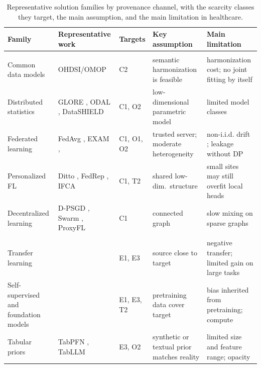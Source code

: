 \documentclass[acmsmall,screen,review]{acmart}
\theoremstyle{acmdefinition}
\begin{document}
\begin{table}[t]
\caption{Representative solution families by provenance channel, with the scarcity classes they target, the main assumption, and the main limitation in healthcare.}
\label{tab:families}
\scriptsize
\setlength{\tabcolsep}{4pt}
\begin{tabularx}{\linewidth}{@{}>{\raggedright\arraybackslash}p{2cm}>{\raggedright\arraybackslash}p{3.3cm}>{\raggedright\arraybackslash}p{0.95cm}>{\raggedright\arraybackslash}X>{\raggedright\arraybackslash}X@{}}
\toprule
Family & Representative work & Targets & Key assumption & Main limitation\\
\midrule
\multicolumn{5}{@{}l}{\emph{P1 Pooling}}\\
Common data models & OHDSI/OMOP \cite{hripcsak2015observational,overhage2012validation} & C2 & semantic harmonization is feasible & harmonization cost; no joint fitting by itself\\
Distributed statistics & GLORE \cite{wu2012grid}, ODAL \cite{duan2020learning}, DataSHIELD \cite{gaye2014datashield} & C1, O2 & low-dimensional parametric model & limited model classes\\
Federated learning & FedAvg \cite{mcmahan2017communication}, EXAM \cite{dayan2021federated}, \cite{pati2022federated} & C1, O1, O2 & trusted server; moderate heterogeneity & non-i.i.d. drift \cite{hsieh2020non}; leakage without DP \cite{geiping2020inverting}\\
Personalized FL & Ditto \cite{li2021ditto}, FedRep \cite{collins2021exploiting}, IFCA \cite{ghosh2020efficient} & C1, T2 & shared low-dim.\ structure & small sites may still overfit local heads\\
Decentralized learning & D-PSGD \cite{lian2017can}, Swarm \cite{warnatherresthal2021swarm}, ProxyFL \cite{kalra2023decentralized} & C1 & connected graph & slow mixing on sparse graphs\\
\midrule
\multicolumn{5}{@{}l}{\emph{P2 Proxy}}\\
Transfer learning & \cite{pan2010survey,raghu2019transfusion} & E1, E3 & source close to target & negative transfer; limited gain on large tasks\\
Self-supervised and foundation models & \cite{azizi2021big,moor2023foundation,zhou2023foundation} & E1, E3, T2 & pretraining data cover target & bias inherited from pretraining; compute\\
Tabular priors & TabPFN \cite{hollmann2025accurate}, TabLLM \cite{hegselmann2023tabllm} & E3, O2 & synthetic or textual prior matches reality & limited size and feature range; opacity\\

\end{tabularx}
\end{table}
\end{document}
